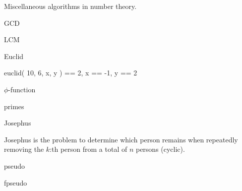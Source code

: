 
Miscellaneous algorithms in number theory.

\begin{algorithm}{GCD}
\end{algorithm}

\begin{algorithm}{LCM}
\end{algorithm}

\begin{algorithm}{Euclid}
\begin{example}
	euclid( 10, 6, x, y ) == 2, x == -1, y == 2
\end{example}
\end{algorithm}

\begin{algorithm}{$\phi$-function}
\end{algorithm}

\begin{algorithm}{primes}
\end{algorithm}


\begin{algorithm}{Josephus}

Josephus is the problem to determine which person remains when repeatedly
removing the $k$:th person from a total of $n$ persons (cyclic).
\end{algorithm}


\begin{algorithm}{pseudo}
\end{algorithm}

\begin{algorithm}{fpseudo}
\characteristics{{\tt fpseudo} gives a pseudo-random number in $[0,1)$.}
\end{algorithm}
